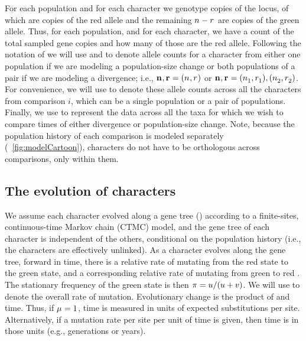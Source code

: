 For each population and for each character we genotype \allelecount copies
of the locus, \redallelecount of which are copies of the red allele and the
remaining $\allelecount - \redallelecount$ are copies of the green allele.
Thus, for each population, and for each character, we have a count of the
total sampled gene copies and how many of those are the red allele.
Following the notation of \citet{Oaks2018ecoevolity}
we will use \leafallelecounts and \leafredallelecounts to denote allele counts
for a character from either one population if we are modeling a population-size
change or both populations of a pair if we are modeling a divergence; i.e., 
$\leafallelecounts, \leafredallelecounts = (\allelecount, \redallelecount)$
or
$\leafallelecounts, \leafredallelecounts = (\allelecount[1],
\redallelecount[1]), (\allelecount[2], \redallelecount[2])$.
For convenience, we will use \comparisondata[i] to denote these allele counts
across all the characters from comparison $i$, which can be a single population
or a pair of populations.
Finally, we use \alldata to represent the data across all the taxa for which we
wish to compare times of either divergence or population-size change.
Note, because the population history of each comparison is modeled separately
(\fig{}~\ref{fig:modelCartoon}),
characters do not have to be orthologous across comparisons, only within them.


\subsection{The evolution of characters}

We assume each character evolved along a gene tree (\genetree)
according to a finite-sites, continuous-time Markov chain (CTMC) model,
and the gene tree of each character is independent of the others,
conditional on the population history (i.e., the characters are effectively
unlinked).
As a character evolves along the gene tree, forward in time, there is a relative
rate \rgmurate of mutating from the red state to the green state,
and a corresponding relative rate \grmurate of mutating from green to red
\citep{Bryant2012,Oaks2018ecoevolity}.
The stationary frequency of the green state is then
$\gfreq = \rgmurate / (\rgmurate + \grmurate)$.
We will use \murate to denote the overall rate of mutation.
Evolutionary change is the product of \murate and time.
Thus, if $\murate = 1$, time is measured in
units of expected substitutions per site.
Alternatively, if a mutation rate per site per unit of time is given, then time
is in those units (e.g., generations or years).

